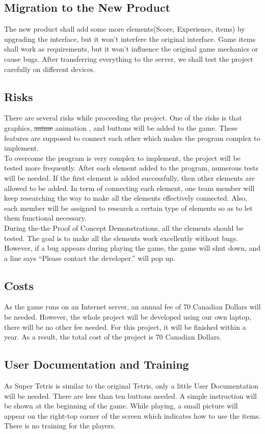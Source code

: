 \documentclass[12pt, titlepage]{article}
\begin{document}
\subsection{Migration to the New Product}
\tab The new product shall add some more elements(Score, Experience, items) by upgrading the interface, but it won't interfere the original interface. Game items shall work as requirements, but it won't influence the original game mechanics or cause bugs. After transferring everything to the server, we shall test the project carefully on different devices.
\newpage
\subsection{Risks}
\tab There are several risks while proceeding the project. One of the risks is that graphics,  \st{anime} {\color{red} animation} , and buttons will be added to the game. These features are supposed to connect each other which makes the program complex to implement. \\
\newline
\tab To overcome the program is very complex to implement, the project will be tested more frequently. After each element added to the program, numerous tests will be needed. If the first element is added successfully, then other elements are allowed to be added. In term of connecting each element, one team member will keep researching the way to make all the elements effectively connected. Also, each member will be assigned to research a certain type of elements so as to let them functional necessary. \\
\newline
\tab During the-the Proof of Concept Demonstrations, all the elements should be tested. The goal is to make all the elements work excellently without bugs. However, if a bug appears during playing the game, the game will shut down, and a line says “Please contact the developer.” will pop up.
\subsection{Costs}
\tab As the game runs on an Internet server, an annual fee of 70 Canadian Dollars will be needed. However, the whole project will be developed using our own laptop, there will be no other fee needed. For this project, it will be finished within a year. As a result, the total cost of the project is 70 Canadian Dollars.
\subsection{User Documentation and Training}
\tab As Super Tetris is similar to the original Tetris, only a little User Documentation will be needed. There are less than ten buttons needed. A simple instruction will be shown at the beginning of the game. While playing, a small picture will appear on the right-top corner of the screen which indicates how to use the items. There is no training for the players.
\end{document}
